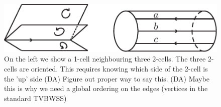 \documentclass[12pt,a4paper]{article}
\newcommand{\dave}[1]{{\color{ao(english)}\footnotesize{(DA) #1}}}
\begin{document}
\begin{figure}
\begin{center}
\includegraphics{Onehandle.pdf}
\caption{\label{OneHandle}
On the left we show a 1-cell neighbouring three 2-cells. 
The three 2-cells are oriented.
This requires knowing which side of the 2-cell is the 'up' side
\dave{Figure out proper way to say this.}
\dave{Maybe this is why we need a global ordering on the edges (vertices in the standard TVBWSS)}
}
\end{center}
\end{figure}
\end{document}
